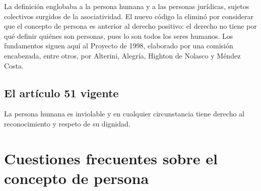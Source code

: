 \documentclass[12pt,oneside]{book}
\begin{document}
La definición englobaba a la persona humana y a las personas jurídicas, sujetos colectivos surgidos de la asociatividad. El nuevo código la eliminó por considerar que el concepto de persona es anterior al derecho positivo: el derecho no tiene por qué definir quiénes son personas, pues lo son todos los seres humanos. Los fundamentos siguen aquí al Proyecto de 1998, elaborado por una comisión encabezada, entre otros, por Alterini, Alegría, Highton de Nolasco y Méndez Costa.

\subsection{El artículo 51 vigente}

\begin{regla}
La persona humana es inviolable y en cualquier circunstancia tiene derecho al reconocimiento y respeto de su dignidad.
\end{regla}

\section{Cuestiones frecuentes sobre el concepto de persona}
\end{document}

